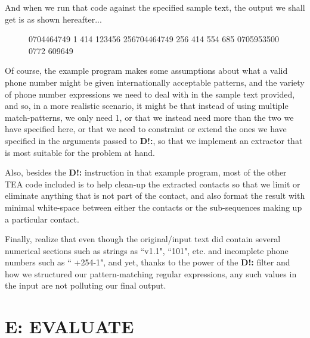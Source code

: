 \documentclass[a4paper, 18pt]{book} %
\begin{document}
And when we run that code against the specified sample text, the output we shall get is as shown hereafter...


\begin{figure}[H]
  \centering
  \begin{tcolorbox}[title=Sample Text Containing Phone Contacts,  breakable,listing options={basicstyle=\ttfamily, breaklines=true, breakatwhitespace=true}]
0704464749 1 414 123456 256704464749 256 414 554 685 0705953500 0772 609649
  \end{tcolorbox}
\end{figure}

Of course, the example program makes some assumptions about what a valid phone number might be given internationally acceptable patterns, and the variety of phone number expressions we need to deal with in the sample text provided, and so, in a more realistic scenario, it might be that instead of using multiple match-patterns, we only need 1, or that we instead need more than the two we have specified here, or that we need to constraint or extend the ones we have specified in the arguments passed to \textbf{D!:}, so that we implement an extractor that is most suitable for the problem at hand.

\vspace{1em}


Also, besides the \textbf{D!:} instruction in that example program, most of the other TEA code included is to help clean-up the extracted contacts so that we limit or eliminate anything that is not part of the contact, and also format the result with minimal white-space between either the contacts or the sub-sequences making up a particular contact.

\vspace{1em}

Finally, realize that even though the original/input text did contain several numerical sections such as strings as ``v1.1", ``101", etc. and incomplete phone numbers such as `` +254-1", and yet, thanks to the power of the \textbf{D!:} filter and how we structured our pattern-matching regular expressions, any such values in the input are not polluting our final output.



 
\chapter{E: EVALUATE}
\label{CHAPE}
\end{document}
